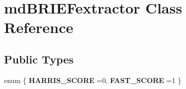 \hypertarget{classmdBRIEFextractor}{}\section{md\+B\+R\+I\+E\+Fextractor Class Reference}
\label{classmdBRIEFextractor}
\subsection*{Public Types}
\begin{DoxyCompactItemize}
\item 
enum \{ {\bfseries H\+A\+R\+R\+I\+S\+\_\+\+S\+C\+O\+RE} =0, 
{\bfseries F\+A\+S\+T\+\_\+\+S\+C\+O\+RE} =1
 \}\hypertarget{classmdBRIEFextractor_a2279809ca1249b3020ac675e25d0a20d}{}\label{classmdBRIEFextractor_a2279809ca1249b3020ac675e25d0a20d}

\end{DoxyCompactItemize}
